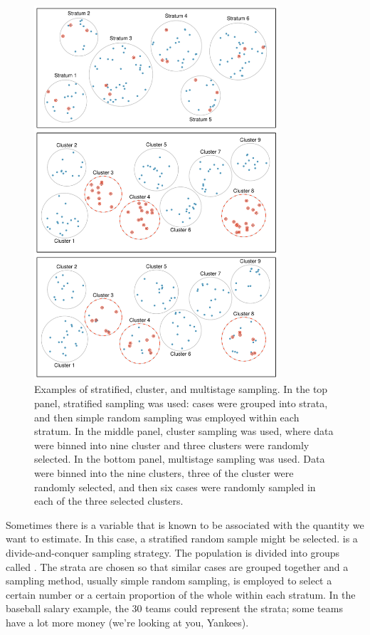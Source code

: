 \begin{figure}
\centering
\includegraphics[width=0.81\textwidth]{ch_data_collection/figures/samplingMethodsFigure/stratified_cluster_multistage}
\caption{Examples of stratified, cluster, and multistage sampling. In the top panel, stratified sampling was used: cases were grouped into strata, and then simple random sampling was employed within each stratum. In the middle panel, cluster sampling was used, where data were binned into nine cluster and three clusters were randomly selected. In the bottom panel, multistage sampling was used. Data were binned into the nine clusters, three of the cluster were randomly selected, and then six cases were randomly sampled in each of the three selected clusters.}
\label{stratified_cluster_multistage}
\end{figure}

Sometimes there is a variable that is known to be associated with the quantity we want to estimate. In this case, a stratified random sample might be selected.  is a divide-and-conquer sampling strategy. The population is divided into groups called . The strata are chosen so that similar cases are grouped together and a sampling method, usually simple random sampling, is employed to select a certain number or a certain proportion of the whole within each stratum. In the baseball salary example, the 30 teams could represent the strata; some teams have a lot more money (we're looking at you, Yankees).

